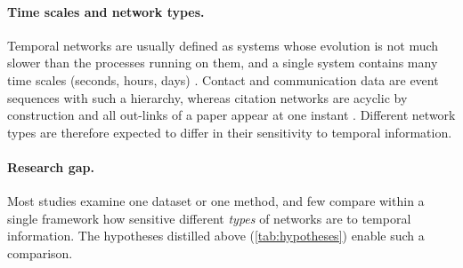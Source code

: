 \paragraph{Time scales and network types.}
Temporal networks are usually defined as systems whose evolution is not much slower
than the processes running on them, and a single system contains many time scales
(seconds, hours, days) \citep{holme2015modern}. Contact and communication data are
event sequences with such a hierarchy, whereas citation networks are acyclic by
construction and all out-links of a paper appear at one instant
\citep{holme2015modern}. Different network types are therefore expected to differ in
their sensitivity to temporal information.

\paragraph{Research gap.}
Most studies examine one dataset or one method, and few compare within a single
framework how sensitive different \emph{types} of networks are to temporal information.
The hypotheses distilled above (\cref{tab:hypotheses}) enable such a comparison.

